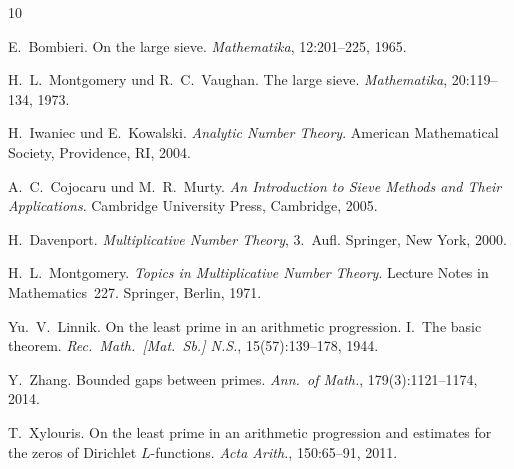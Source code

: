 \documentclass[12pt,a4paper]{amsart}
\theoremstyle{definition}
\begin{document}
\begin{thebibliography}{10}

E.~Bombieri.
\newblock On the large sieve.
\newblock \emph{Mathematika}, 12:201--225, 1965.

H.~L.~Montgomery und R.~C.~Vaughan.
\newblock The large sieve.
\newblock \emph{Mathematika}, 20:119--134, 1973.

H.~Iwaniec und E.~Kowalski.
\newblock \emph{Analytic Number Theory}.
\newblock American Mathematical Society, Providence, RI, 2004.

A.~C.~Cojocaru und M.~R.~Murty.
\newblock \emph{An Introduction to Sieve Methods and Their Applications}.
\newblock Cambridge University Press, Cambridge, 2005.

H.~Davenport.
\newblock \emph{Multiplicative Number Theory}, 3.~Aufl.
\newblock Springer, New York, 2000.

H.~L.~Montgomery.
\newblock \emph{Topics in Multiplicative Number Theory}.
\newblock Lecture Notes in Mathematics~227. Springer, Berlin, 1971.

Yu.~V.~Linnik.
\newblock On the least prime in an arithmetic progression.
  I.~The basic theorem.
\newblock \emph{Rec.\ Math.\ [Mat.\ Sb.] N.S.}, 15(57):139--178, 1944.

Y.~Zhang.
\newblock Bounded gaps between primes.
\newblock \emph{Ann.\ of Math.}, 179(3):1121--1174, 2014.

T.~Xylouris.
\newblock On the least prime in an arithmetic progression and estimates for
  the zeros of Dirichlet $L$-functions.
\newblock \emph{Acta Arith.}, 150:65--91, 2011.

\end{thebibliography}
\end{document}
